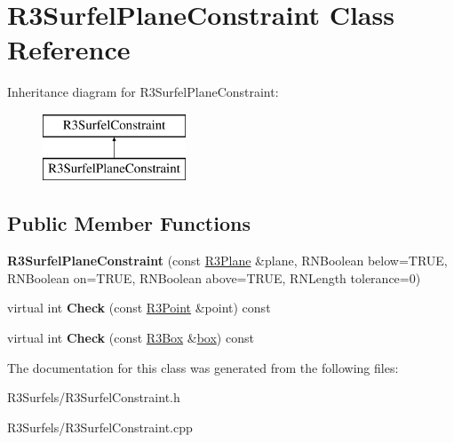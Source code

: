 \hypertarget{class_r3_surfel_plane_constraint}{}\section{R3\+Surfel\+Plane\+Constraint Class Reference}
\label{class_r3_surfel_plane_constraint}
Inheritance diagram for R3\+Surfel\+Plane\+Constraint\+:\begin{figure}[H]
\begin{center}
\leavevmode
\includegraphics[height=2.000000cm]{class_r3_surfel_plane_constraint}
\end{center}
\end{figure}
\subsection*{Public Member Functions}
\begin{DoxyCompactItemize}
\item 
{\bfseries R3\+Surfel\+Plane\+Constraint} (const \hyperlink{class_r3_plane}{R3\+Plane} \&plane, R\+N\+Boolean below=T\+R\+UE, R\+N\+Boolean on=T\+R\+UE, R\+N\+Boolean above=T\+R\+UE, R\+N\+Length tolerance=0)\hypertarget{class_r3_surfel_plane_constraint_aa9df0dc135fd32ba87f8829038473119}{}\label{class_r3_surfel_plane_constraint_aa9df0dc135fd32ba87f8829038473119}

\item 
virtual int {\bfseries Check} (const \hyperlink{class_r3_point}{R3\+Point} \&point) const \hypertarget{class_r3_surfel_plane_constraint_ab2b7e2ccec1485915f84f5560c5027f3}{}\label{class_r3_surfel_plane_constraint_ab2b7e2ccec1485915f84f5560c5027f3}

\item 
virtual int {\bfseries Check} (const \hyperlink{class_r3_box}{R3\+Box} \&\hyperlink{structbox}{box}) const \hypertarget{class_r3_surfel_plane_constraint_a21e5f4c3ae15f38fcfe6623e156f152f}{}\label{class_r3_surfel_plane_constraint_a21e5f4c3ae15f38fcfe6623e156f152f}

\end{DoxyCompactItemize}


The documentation for this class was generated from the following files\+:\begin{DoxyCompactItemize}
\item 
R3\+Surfels/R3\+Surfel\+Constraint.\+h\item 
R3\+Surfels/R3\+Surfel\+Constraint.\+cpp\end{DoxyCompactItemize}
